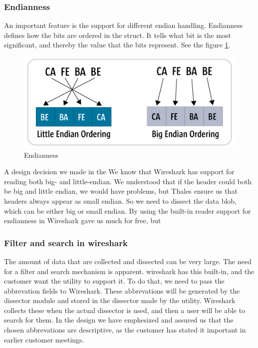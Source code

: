 \subsubsection{Endianness}
An important feature is the support for different endian handling. Endianness defines how the bits are ordered in the struct. It tells what bit is the most significant, and thereby the value that the bits represent. See the figure \ref{fig:endianness}.

\begin{figure}[!htb]
	\includegraphics[width=\textwidth]{./sprints/img/endianness}
	\caption{Endianness\label{fig:endianness}}
\end{figure}

A design decision we made in the 
We know that Wireshark has support for reading both big- and little-endian. We understood that if the header could both be big and little endian, we would have problems, but Thales ensure us that headers always appear as small endian. So we need to dissect the data blob, which can be either big or small endian. By using the built-in reader support for endianness in Wireshark gave us much for free, but 


\subsubsection{Filter and search in \Gls{wireshark}}
The amount of data that are collected and dissected can be very large. The need for a filter and search mechanism is apparent. \Gls{wireshark} has this built-in, and the customer want the \gls{utility} to support it. To do that, we need to pass the abbrevation fields to Wireshark. These abbrevations will be generated by the dissector module and stored in the dissector made by the utility. Wireshark collects these when the actual dissector is used, and then a user will be able to search for them. In the design we have emphesized and assured us that the chosen abbrevations are descriptive, as the customer has stated it important in earlier customer meetings. 

